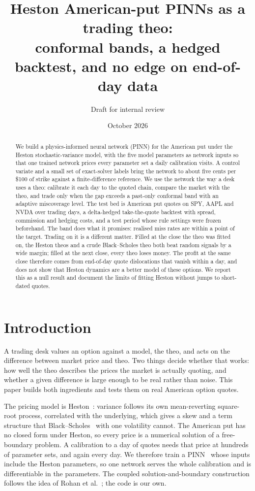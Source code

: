 \documentclass[11pt]{article}
\title{Heston American-put PINNs as a trading theo:\\
conformal bands, a hedged backtest, and no edge on end-of-day data}
\author{Draft for internal review}
\date{October 2026}
\begin{document}
\maketitle

\begin{abstract}
We build a physics-informed neural network (PINN) for the American put under the Heston stochastic-variance model, with the five model parameters as network inputs so that one trained network prices every parameter set a daily calibration visits. A control variate and a small set of exact-solver labels bring the network to about five cents per \$100 of strike against a finite-difference reference. We use the network the way a desk uses a theo: calibrate it each day to the quoted chain, compare the market with the theo, and trade only when the gap exceeds a past-only conformal band with an adaptive miscoverage level. The test bed is \nQuotes{} American put quotes on SPY, AAPL and NVDA over \nDates{} trading days, a delta-hedged take-the-quote backtest with spread, commission and hedging costs, and a test period whose rule settings were frozen beforehand. The band does what it promises: realised miss rates are within a point of the target. Trading on it is a different matter. Filled at the close the theo was fitted on, the Heston theos and a crude Black--Scholes theo both beat random signals by a wide margin; filled at the next close, every theo loses money. The profit at the same close therefore comes from end-of-day quote dislocations that vanish within a day, and does not show that Heston dynamics are a better model of these options. We report this as a null result and document the limits of fitting Heston without jumps to short-dated quotes.
\end{abstract}

\section{Introduction}
A trading desk values an option against a model, the theo, and acts on the difference between market price and theo. Two things decide whether that works: how well the theo describes the prices the market is actually quoting, and whether a given difference is large enough to be real rather than noise. This paper builds both ingredients and tests them on real American option quotes.

The pricing model is Heston~\cite{heston1993closed}: variance follows its own mean-reverting square-root process, correlated with the underlying, which gives a skew and a term structure that Black--Scholes~\cite{black1973pricing} with one volatility cannot. The American put has no closed form under Heston, so every price is a numerical solution of a free-boundary problem. A calibration to a day of quotes needs that price at hundreds of parameter sets, and again every day. We therefore train a PINN~\cite{raissi2019physics} whose inputs include the Heston parameters, so one network serves the whole calibration and is differentiable in the parameters. The coupled solution-and-boundary construction follows the idea of Rohan et al.~\cite{rohan2026coupled}; the code is our own.
\end{document}
